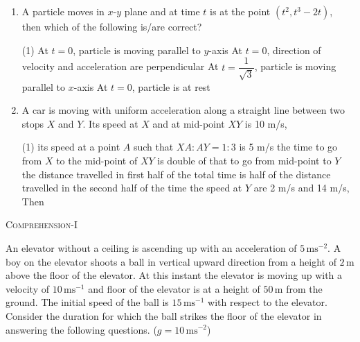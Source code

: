 \documentclass{article}
\begin{document}
\begin{enumerate}
    \item A particle moves in \(x\)-\(y\) plane and at time \(t\) is at the point \((t^2, t^3 - 2t)\), then which of the following is/are correct?
    \begin{tasks}(1)
        \task At \( t = 0 \), particle is moving parallel to \(y\)-axis
        \task At \( t = 0 \), direction of velocity and acceleration are perpendicular
        \task At \( t = \dfrac{1}{\sqrt{3}} \), particle is moving parallel to \(x\)-axis
        \task At \( t = 0 \), particle is at rest
    \end{tasks}
    
    \item A car is moving with uniform acceleration along a straight line between two stops \(X\) and \(Y\). Its speed at \(X\) and at mid-point \(XY\) is 10 m/s,
    \begin{tasks}(1)
        \task its speed at a point \(A\) such that \(XA : AY = 1 : 3\) is 5 m/s
        \task the time to go from \(X\) to the mid-point of \(XY\) is double of that to go from mid-point to \(Y\)
        \task the distance travelled in first half of the total time is half of the distance travelled in the second half of the time
        \task the speed at \(Y\) are 2 m/s and 14 m/s, Then
    \end{tasks}
    \end{enumerate}


\pagebreak


\begin{center}
    \textsc{Comprehension-I}
\end{center}
An elevator without a ceiling is ascending up with an acceleration of $5 \, \text{ms}^{-2}$. A boy on the elevator shoots a ball in vertical upward direction from a height of $2\, \text{m}$ above the floor of the elevator. At this instant the elevator is moving up with a velocity of $10\, \text{ms}^{-1}$ and floor of the elevator is at a height of $50\, \text{m}$ from the ground. The initial speed of the ball is $15\, \text{ms}^{-1}$ with respect to the elevator. Consider the duration for which the ball strikes the floor of the elevator in answering the following questions. ($g = 10 \, \text{ms}^{-2}$)
\end{document}
